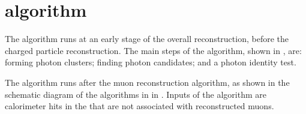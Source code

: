 



\section{\PhotonReconstruction algorithm}
\label{sec:photonRecostrcution}


The \PhotonReconstruction algorithm runs at an early stage of the overall reconstruction, before the charged particle reconstruction.  The main steps of the \PhotonReconstruction algorithm, shown in , are:  forming photon clusters; finding photon candidates; and a photon identity test.

The \PhotonReconstruction algorithm runs after the muon reconstruction algorithm, as shown in the schematic diagram of the algorithms in \pandora in . Inputs of the \PhotonReconstruction algorithm are calorimeter hits in the \ECAL that are not associated with reconstructed muons.



